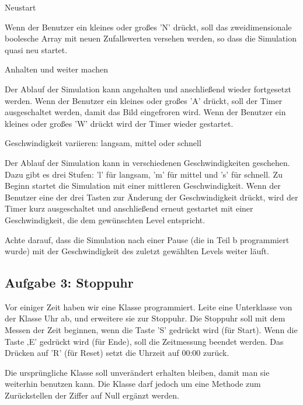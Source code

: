 \begin{compactenum}[a)]
\item Neustart

Wenn der Benutzer ein kleines oder großes ’N’ drückt, soll das zweidimensionale
boolesche Array mit neuen Zufallswerten versehen werden, so dass die Simulation
quasi neu startet.

\item Anhalten und weiter machen

Der Ablauf der Simulation kann angehalten und anschließend wieder fortgesetzt
werden. Wenn der Benutzer ein kleines oder großes ’A’ drückt, soll der Timer
ausgeschaltet werden, damit das Bild eingefroren wird. Wenn der Benutzer ein
kleines oder großes ’W’ drückt wird der Timer wieder gestartet.

\item Geschwindigkeit variieren: langsam, mittel oder schnell

Der Ablauf der Simulation kann in verschiedenen Geschwindigkeiten geschehen.
Dazu gibt es drei Stufen: ’l’ für langsam, ’m’ für mittel und ’s’ für schnell.
Zu Beginn startet die Simulation mit einer mittleren Geschwindigkeit. Wenn der
Benutzer eine der drei Tasten zur Änderung der Geschwindigkeit drückt, wird der
Timer kurz ausgeschaltet und anschließend erneut gestartet mit einer
Geschwindigkeit, die dem gewünschten Level entspricht.

Achte darauf, dass die Simulation nach einer Pause (die in Teil b programmiert
wurde) mit der Geschwindigkeit des zuletzt gewählten Levels weiter läuft.
\end{compactenum} 


\subsection{Aufgabe 3: Stoppuhr}

Vor einiger Zeit haben wir eine Klasse  programmiert. Leite eine
Unterklasse von der Klasse Uhr ab, und erweitere sie zur Stoppuhr. Die Stoppuhr
soll mit dem Messen der Zeit beginnen, wenn die Taste ’S’ gedrückt wird (für
\glqq Start\grqq ). Wenn die Taste ‚E’ gedrückt wird (für \glqq Ende\grqq ),
soll die Zeitmessung beendet werden. Das Drücken auf ’R’ (für \glqq Reset\grqq )
setzt die Uhrzeit auf 00:00 zurück.

Die ursprüngliche Klasse  soll unverändert erhalten bleiben, damit
man sie weiterhin benutzen kann. Die Klasse  darf jedoch um eine
Methode zum Zurückstellen der Ziffer auf Null ergänzt werden.


